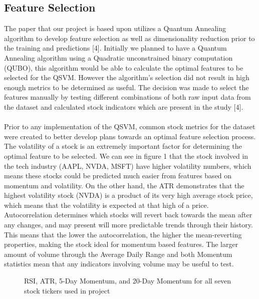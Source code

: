 \documentclass{article}
\begin{document}
\subsection*{Feature Selection}
The paper that our project is based upon utilizes a Quantum Annealing algorithm to develop feature selection as well as dimensionality reduction prior to the training and predictions [4]. Initially we planned to have a Quantum Annealing algorithm using a Quadratic unconstrained binary computation (QUBO), this algorithm would be able to calculate the optimal features to be selected for the QSVM. However the algorithm's selection did not result in high enough metrics to be determined as useful. The decision was made to select the features manually by testing different combinations of both raw input data from the dataset and calculated stock indicators which are present in the study [4]. 
\\ \\ Prior to any implementation of the QSVM, common stock metrics for the dataset were created to better develop plans towards an optimal feature selection process. The volatility of a stock is an extremely important factor for determining the optimal feature to be selected. We can see in figure 1 that the stock involved in the tech industry (AAPL, NVDA, MSFT) have higher volatility numbers, which means these stocks could be predicted much easier from features based on momentum and volatility. On the other hand, the ATR demonstrates that the highest volatility stock (NVDA) is a product of its very high average stock price, which means that the volatility is expected at that high of a price. Autocorrelation determines which stocks will revert back towards the mean after any changes, and may present will more predictable trends through their history. This means that the lower the autocorrelation, the higher the mean-reverting properties, making the stock ideal for momentum based features. The larger amount of volume through the Average Daily Range and both Momentum statistics mean that any indicators involving volume may be useful to test. 
\begin{figure}[H]
    \centering
    \caption{RSI, ATR, 5-Day Momentum, and 20-Day Momentum for all seven stock tickers used in project}
    \label{fig:1}
\end{figure}
\end{document}
